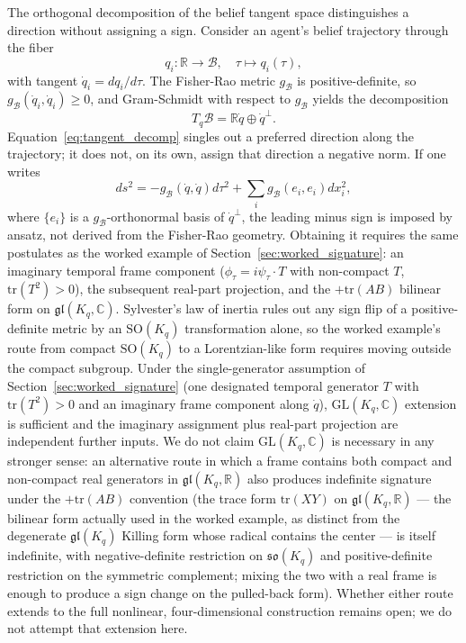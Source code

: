 \documentclass[11pt]{article}
\begin{document}
The orthogonal decomposition of the belief tangent space distinguishes a direction without assigning a sign. Consider an agent's belief trajectory through the fiber
\begin{equation}
q_i: \mathbb{R} \to \mathcal{B}, \quad \tau \mapsto q_i(\tau),
\end{equation}
with tangent $\dot{q}_i = dq_i/d\tau$. The Fisher-Rao metric $g_{\mathcal{B}}$ is positive-definite, so $g_{\mathcal{B}}(\dot{q}_i, \dot{q}_i) \geq 0$, and Gram-Schmidt with respect to $g_{\mathcal{B}}$ yields the decomposition
\begin{equation}
T_q\mathcal{B} = \mathbb{R}\dot{q} \oplus \dot{q}^\perp.
\label{eq:tangent_decomp}
\end{equation}
Equation~\eqref{eq:tangent_decomp} singles out a preferred direction along the trajectory; it does not, on its own, assign that direction a negative norm. If one writes
\begin{equation}
ds^2 = -g_{\mathcal{B}}(\dot{q}, \dot{q}) d\tau^2 + \sum_i g_{\mathcal{B}}(e_i, e_i) dx_i^2,
\label{eq:lor_belief_metric}
\end{equation}
where $\{e_i\}$ is a $g_{\mathcal{B}}$-orthonormal basis of $\dot{q}^\perp$, the leading minus sign is imposed by ansatz, not derived from the Fisher-Rao geometry. Obtaining it requires the same postulates as the worked example of Section~\ref{sec:worked_signature}: an imaginary temporal frame component ($\phi_\tau = i\psi_\tau \cdot T$ with non-compact $T$, $\mathrm{tr}(T^2) > 0$), the subsequent real-part projection, and the $+\mathrm{tr}(AB)$ bilinear form on $\mathfrak{gl}(K_q, \mathbb{C})$. Sylvester's law of inertia rules out any sign flip of a positive-definite metric by an $\mathrm{SO}(K_q)$ transformation alone, so the worked example's route from compact $\mathrm{SO}(K_q)$ to a Lorentzian-like form requires moving outside the compact subgroup. Under the single-generator assumption of Section~\ref{sec:worked_signature} (one designated temporal generator $T$ with $\mathrm{tr}(T^2) > 0$ and an imaginary frame component along $\dot{q}$), $\mathrm{GL}(K_q, \mathbb{C})$ extension is sufficient and the imaginary assignment plus real-part projection are independent further inputs. We do not claim $\mathrm{GL}(K_q, \mathbb{C})$ is necessary in any stronger sense: an alternative route in which a frame contains both compact and non-compact real generators in $\mathfrak{gl}(K_q, \mathbb{R})$ also produces indefinite signature under the $+\mathrm{tr}(AB)$ convention (the trace form $\mathrm{tr}(XY)$ on $\mathfrak{gl}(K_q, \mathbb{R})$ — the bilinear form actually used in the worked example, as distinct from the degenerate $\mathfrak{gl}(K_q)$ Killing form whose radical contains the center — is itself indefinite, with negative-definite restriction on $\mathfrak{so}(K_q)$ and positive-definite restriction on the symmetric complement; mixing the two with a real frame is enough to produce a sign change on the pulled-back form). Whether either route extends to the full nonlinear, four-dimensional construction remains open; we do not attempt that extension here.
\end{document}
